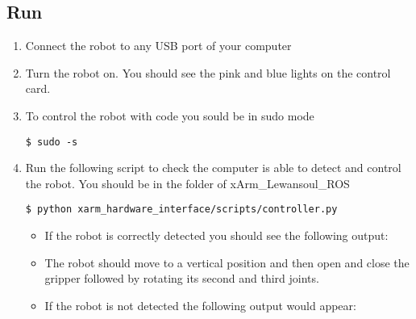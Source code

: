 \documentclass[letterpaper,10pt,english]{sphinxmanual}
\begin{document}
\subsection{Run}
\label{\detokenize{user_guide/1_1_introduction:run}}\begin{enumerate}
%
\item {} 
\sphinxAtStartPar
Connect the robot to any USB port of your computer

\item {} 
\sphinxAtStartPar
Turn the robot on.
You should see the pink and blue lights on the control card.

\item {} 
\sphinxAtStartPar
To control the robot with code you sould be in sudo mode



\begin{Verbatim}[commandchars=\\\{\}]
$ sudo -s
\end{Verbatim}

\item {} 
\sphinxAtStartPar
Run the following script to check the computer is  able to detect and control the robot.
You should be in the folder of xArm\_Lewansoul\_ROS



\begin{Verbatim}[commandchars=\\\{\}]
$ python xarm_hardware_interface/scripts/controller.py
\end{Verbatim}
\begin{itemize}
\item {} 
\sphinxAtStartPar
If the robot is correctly detected you should see the following output:

\begin{figure}[htbp]
\centering

\noindent{}
\end{figure}

\item {} 
\sphinxAtStartPar
The robot should move to a vertical position and then open and close the gripper followed by rotating its second and third joints.

\item {} 
\sphinxAtStartPar
If the robot is not detected the following output would appear:

\begin{figure}[htbp]
\centering


\end{figure}
\end{itemize}
\end{enumerate}
\end{document}
